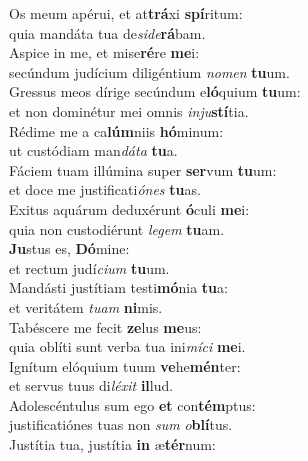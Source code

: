\oddverse Os meum apérui, et at\textbf{trá}xi \textbf{spí}ritum:~\*\\
\oddverse quia mandáta tua de\textit{si}\textit{de}\textbf{rá}bam.\\
\evenverse Aspice in me, et mise\textbf{ré}re \textbf{me}i:~\*\\
\evenverse secúndum judícium diligéntium \textit{no}\textit{men} \textbf{tu}um.\\
\oddverse Gressus meos dírige secúndum e\textbf{ló}quium \textbf{tu}um:~\*\\
\oddverse et non dominétur mei omnis \textit{in}\textit{ju}\textbf{stí}tia.\\
\evenverse Rédime me a ca\textbf{lúm}niis \textbf{hó}minum:~\*\\
\evenverse ut custódiam man\textit{dá}\textit{ta} \textbf{tu}a.\\
\oddverse Fáciem tuam illúmina super \textbf{ser}vum \textbf{tu}um:~\*\\
\oddverse et doce me justificati\textit{ó}\textit{nes} \textbf{tu}as.\\
\evenverse Exitus aquárum deduxérunt \textbf{ó}culi \textbf{me}i:~\*\\
\evenverse quia non custodiérunt \textit{le}\textit{gem} \textbf{tu}am.\\
\oddverse \textbf{Ju}stus es, \textbf{Dó}mine:~\*\\
\oddverse et rectum judí\textit{ci}\textit{um} \textbf{tu}um.\\
\evenverse Mandásti justítiam testi\textbf{mó}nia \textbf{tu}a:~\*\\
\evenverse et veritátem \textit{tu}\textit{am} \textbf{ni}mis.\\
\oddverse Tabéscere me fecit \textbf{ze}lus \textbf{me}us:~\*\\
\oddverse quia oblíti sunt verba tua ini\textit{mí}\textit{ci} \textbf{me}i.\\
\evenverse Ignítum elóquium tuum \textbf{ve}he\textbf{mén}ter:~\*\\
\evenverse et servus tuus di\textit{lé}\textit{xit} \textbf{il}lud.\\
\oddverse Adolescéntulus sum ego \textbf{et} con\textbf{tém}ptus:~\*\\
\oddverse justificatiónes tuas non \textit{sum} \textit{o}\textbf{blí}tus.\\
\evenverse Justítia tua, justítia \textbf{in} æ\textbf{tér}num:~\*\\
